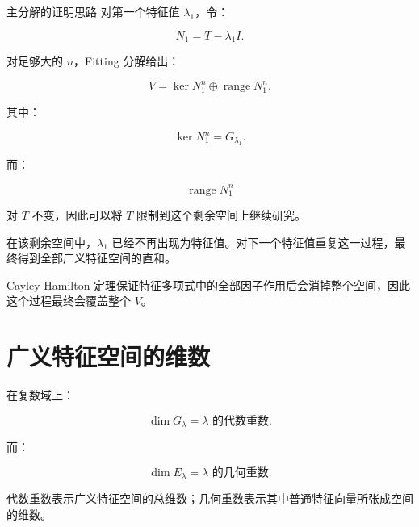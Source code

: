 \begin{jproof}{主分解的证明思路}
对第一个特征值 $\lambda_1$，令：

\[
N_1=T-\lambda_1I.
\]

对足够大的 $n$，Fitting 分解给出：

\[
V
=
\ker N_1^n
\oplus
\operatorname{range}N_1^n.
\]

其中：

\[
\ker N_1^n=G_{\lambda_1}.
\]

而：

\[
\operatorname{range}N_1^n
\]

对 $T$ 不变，因此可以将 $T$ 限制到这个剩余空间上继续研究。

在该剩余空间中，$\lambda_1$ 已经不再出现为特征值。对下一个特征值重复这一过程，最终得到全部广义特征空间的直和。

Cayley-Hamilton 定理保证特征多项式中的全部因子作用后会消掉整个空间，因此这个过程最终会覆盖整个 $V$。
\end{jproof}

\section{广义特征空间的维数}

在复数域上：

\[
\dim G_\lambda
=
\lambda\text{ 的代数重数}.
\]

而：

\[
\dim E_\lambda
=
\lambda\text{ 的几何重数}.
\]

代数重数表示广义特征空间的总维数；几何重数表示其中普通特征向量所张成空间的维数。
